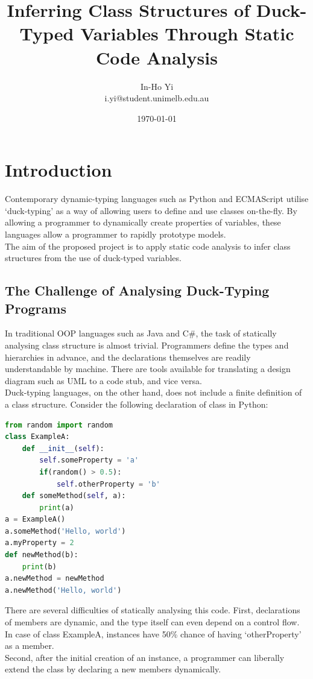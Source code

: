 \documentclass[a4paper,12pt]{article}
\begin{document}
\title{Inferring Class Structures of Duck-Typed Variables Through Static Code Analysis}
\author{In-Ho Yi\\
i.yi@student.unimelb.edu.au
}
\date{\today}
\maketitle
\section{Introduction}
Contemporary dynamic-typing languages such as Python and ECMAScript utilise `duck-typing' as a way of allowing users to define and use classes on-the-fly. By allowing a programmer to dynamically create properties of variables, these languages allow a programmer to rapidly prototype models.\\
The aim of the proposed project is to apply static code analysis to infer class structures from the use of duck-typed variables.\\


\subsection{The Challenge of Analysing Duck-Typing Programs}
In traditional OOP languages such as Java and C\#, the task of statically analysing class structure is almost trivial. Programmers define the types and hierarchies in advance, and the declarations themselves are readily understandable by machine. There are tools available for translating a design diagram such as UML to a code stub, and vice versa.\\
Duck-typing languages, on the other hand, does not include a finite definition of a class structure. Consider the following declaration of class in Python:\\
\begin{lstlisting}[caption=Python class creation, language=Python]
from random import random
class ExampleA:
    def __init__(self):
        self.someProperty = 'a'
        if(random() > 0.5):
            self.otherProperty = 'b'
    def someMethod(self, a):
        print(a)
a = ExampleA()
a.someMethod('Hello, world')
a.myProperty = 2
def newMethod(b):
    print(b)
a.newMethod = newMethod
a.newMethod('Hello, world')
\end{lstlisting}
There are several difficulties of statically analysing this code. First, declarations of members are dynamic, and the type itself can even depend on a control flow. In case of class ExampleA, instances have 50\% chance of having `otherProperty' as a member.\\
Second, after the initial creation of an instance, a programmer can liberally extend the class by declaring a new members dynamically.
\end{document}
